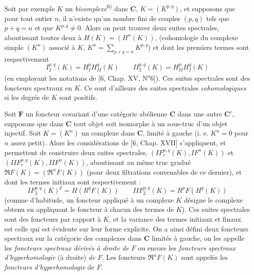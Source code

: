 
Soit par exemple $K$ un \textit{bicomplexe}\textsuperscript{6)} dans $\mathbf{C}$, $K=(K^{p,q})$, et
supposons que pour tout entier $n$, il n'existe qu'un nombre fini de couples
$(p,q)$ tels que $p+q=n$ et que $K^{p,q}\ne0$. Alors on peut trouver deux
suites spectrales, aboutissant toutes deux à $H(K)=(H^n(K))$, (cohomologie du
complexe simple $(K^n)$ associé à $K$,
$K^n=\displaystyle\sum_{p+q=n}K^{p,q}$) et dont les premiers termes sont respectivement
\[
\tag{2.4.1}
I_2^{p,q}(K)=H_{I}^pH_{II}^q(K)
\qquad
II_2^{p,q}(K)=H_{II}^pH_{I}^q(K)
\]
(en employant les notations de [6, Chap. XV, N\textsuperscript{o}6]). Ces
suites spectrales sont des foncteurs spectraux en $K$. Ce sont d'ailleurs des
suites spectrales \textit{cohomologiques} si les degrés de $K$ sont positifs.

Soit $\mathbf{F}$ un foncteur covariant d'une catégorie abélienne $\mathbf{C}$ dans une autre
$\mathbf{C}'$, supposons que dans $\mathbf{C}$ tout objet soit isomorphe à un sous-truc d'un
objet injectif. Soit $K=(K^n)$ un complexe dans $\mathbf{C}$, limité à gauche (i. e.
$K^n=0$ pour $n$ assez petit). Alors les considérations de [6, Chap. XVII]
s'appliquent, et permettent de construire deux suites spectrales,
$(IF_r^{p,q}(K),IF^n(K))$ et
$(IIF_r^{p,q}(K),IIF^n(K))$, aboutissant au même
truc gradué $\mathfrak R F(K)=(\mathfrak R^nF(K))$ (pour deux filtrations
convenables de ce dernier), et dont les termes initiaux sont respectivement :
\[
\tag{2.4.2}
IF_2^{p,q}(K)^p=H(R^qF(K))
\qquad
IIF_2^{p,q}(K)=R^pF(H^q(K))
\]
(comme d'habitude, un foncteur appliqué à un complexe $K$ désigne le complexe
obtenu en appliquant le foncteur à chacun des termes de $K$). Ces suites
spectrales sont des foncteurs par rapport à $K$, et la variance des termes
initiaux et finaux est celle qui est évidente sur leur forme explicite. On a
ainsi défini deux foncteurs spectraux sur la catégorie des complexes dans $\mathbf{C}$
limités à gauche, on les appelle les \textit{foncteurs spectraux dérivés à
droite de $F$} ou encore les \textit{foncteurs spectraux d'hyperhomologie} (à
droite) \textit{de $F$}. Les foncteurs $\mathfrak R^nF(K)$ sont appelés les
\textit{foncteurs d'hyperhomologie} de $F$.

